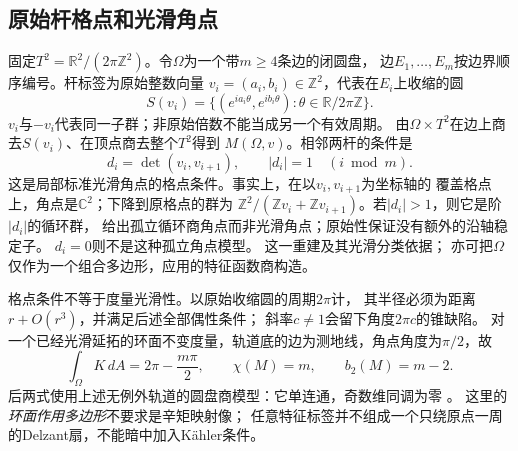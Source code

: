 \documentclass[UTF8,a4paper,11pt,fontset=fandol]{ctexart}
\numberwithin{equation}{section}
\theoremstyle{definition}
\newcommand{\R}{\mathbb R}
\newcommand{\Z}{\mathbb Z}
\begin{document}
\subsection{原始杆格点和光滑角点}
固定$T^2=\R^2/(2\pi\Z^2)$。令$\Omega$为一个带$m\ge4$条边的闭圆盘，
边$E_1,\ldots,E_m$按边界顺序编号。杆标签为原始整数向量
$v_i=(a_i,b_i)\in\Z^2$，代表在$E_i$上收缩的圆
\[
 S(v_i)=\{(e^{ia_i\theta},e^{ib_i\theta}):\theta\in\R/2\pi\Z\}.
\]
$v_i$与$-v_i$代表同一子群；非原始倍数不能当成另一个有效周期。
由$\Omega\times T^2$在边上商去$S(v_i)$、在顶点商去整个$T^2$得到
$M(\Omega,v)$。相邻两杆的条件是
\begin{equation}\label{eq:toric-lattice-corner}
 d_i=\det(v_i,v_{i+1}),\qquad |d_i|=1
 \quad(i\bmod m).
\end{equation}
这是局部标准光滑角点的格点条件。事实上，在以$v_i,v_{i+1}$为坐标轴的
覆盖格点上，角点是$\mathbb C^2$；下降到原格点的群为
$\Z^2/(\Z v_i+\Z v_{i+1})$。若$|d_i|>1$，则它是阶$|d_i|$的循环群，
给出孤立循环商角点而非光滑角点；原始性保证没有额外的沿轴稳定子。
$d_i=0$则不是这种孤立角点模型。
这一重建及其光滑分类依据\cite[\S\S3,5]{OrlikRaymond}；
亦可把$\Omega$仅作为一个组合多边形，应用\cite[\S1]{DJ1991}的特征函数商构造。

格点条件不等于度量光滑性。以原始收缩圆的周期$2\pi$计，
其半径必须为距离$r+O(r^3)$，并满足后述全部偶性条件；
斜率$c\ne1$会留下角度$2\pi c$的锥缺陷。
对一个已经光滑延拓的环面不变度量，轨道底的边为测地线，角点角度为$\pi/2$，故
\begin{equation}\label{eq:toric-gauss-bonnet}
 \int_\Omega K\,dA=2\pi-\frac{m\pi}{2},\qquad
 \chi(M)=m,\qquad b_2(M)=m-2.
\end{equation}
后两式使用上述无例外轨道的圆盘商模型：它单连通，奇数维同调为零
\cite[\S3，特别是Corollary 3.9]{DJ1991}。
这里的\emph{环面作用多边形}不要求是辛矩映射像；
任意特征标签并不组成一个只绕原点一周的Delzant扇，不能暗中加入Kähler条件。
\end{document}
